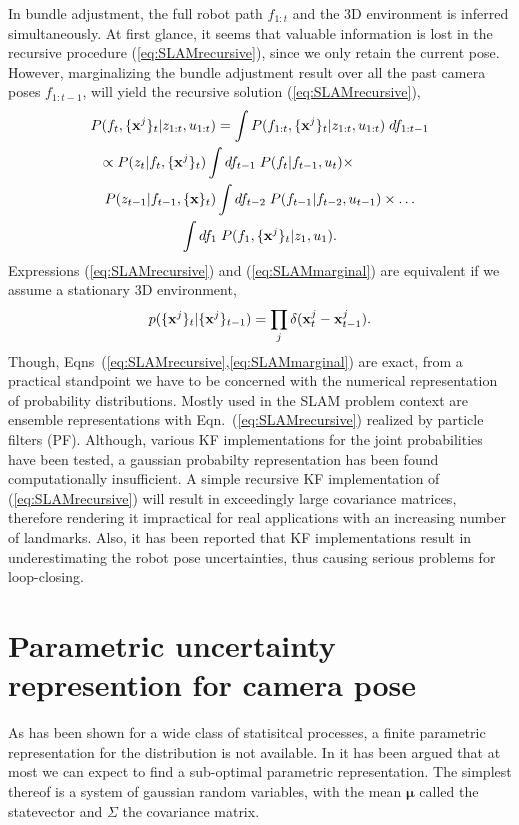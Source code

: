 \documentclass[conference]{IEEEtran}
\newcommand{\beq}{\begin{equation}}
\newcommand{\eeq}{\end{equation}}
\begin{document}
In bundle adjustment, the full robot path $f_{1:t}$ and the 3D environment is inferred simultaneously. At first glance, it seems that valuable information is lost in the recursive procedure (\ref{eq:SLAMrecursive}),
since we only retain the current pose. However, marginalizing the bundle adjustment result over all the past
camera poses $f_{1:t-1}$, will yield the recursive solution (\ref{eq:SLAMrecursive}),
\begin{multline}
    P(f_t,\{ {\bf x}^j \}_t | z_{1:t},u_{1:t}) = \int P(f_{1:t},\{ {\bf x}^j \}_t | z_{1:t},u_{1:t}) \; df_{1:t-1} \\
    \shoveleft{\propto P(z_t | f_t,\{ {\bf x}^j \}_t) \int df_{t-1} \; P( f_t | f_{t-1}, u_t) \times} \\
    P(z_{t-1} | f_{t-1},\{ {\bf x} \}_t) \int df_{t-2} \;  P( f_{t-1} | f_{t-2}, u_{t-1}) \times \ldots \\
    \int df_1 \; P(f_{1}, \{ {\bf x}^j \}_t | z_{1},u_{1}) \label{eq:SLAMmarginal}.
\end{multline}
Expressions (\ref{eq:SLAMrecursive}) and (\ref{eq:SLAMmarginal}) are equivalent if we assume a stationary
3D environment,
\beq
    p( \{ {\bf x}^j \}_t | \{ {\bf x}^j \}_{t-1} ) = \prod_j \delta( {\bf x}^j_t - {\bf x}^j_{t-1} ). \label{eq:static3D}
\eeq
Though, Eqns~(\ref{eq:SLAMrecursive},\ref{eq:SLAMmarginal}) are exact, from a practical standpoint we have to be concerned with the numerical representation of probability distributions.
Mostly used in the SLAM problem context are ensemble representations with Eqn.~(\ref{eq:SLAMrecursive}) realized by
particle filters (PF). Although, various KF implementations for the joint probabilities have been tested, a gaussian
probabilty representation has been found computationally insufficient\cite{Thurn}. A simple recursive KF implementation of (\ref{eq:SLAMrecursive}) will result in exceedingly large covariance matrices, therefore rendering
it impractical for real applications with an increasing number of landmarks. Also, it has been reported that KF implementations result in underestimating the robot pose uncertainties, thus causing serious problems for loop-closing.

\section{Parametric uncertainty represention for camera pose}

As has been shown for a wide class of statisitcal processes, a finite parametric representation
for the distribution is not available. In \cite{Mfm-Steffano} it has been argued that at most
we can expect to find a sub-optimal parametric representation. The simplest thereof is a system
of gaussian random variables, with the mean $\mathbf{\mu}$ called the statevector and $\mathsf \Sigma$
the covariance matrix.
\end{document}
